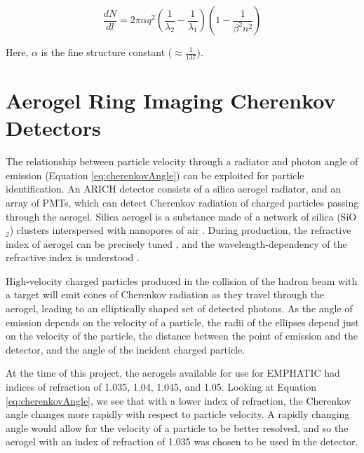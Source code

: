 \begin{equation}
    \label{eq:photonNumber}
    \frac{dN}{dl}  = 2\pi\alpha q^2 \left(\frac{1}{\lambda_2} - \frac{1}{\lambda_1}
    \right)\left(1 - \frac{1}{\beta^2n^2}\right)
\end{equation}

Here, $\alpha$ is the fine structure constant ($\approx \frac{1}{137}$).



\section{Aerogel Ring Imaging Cherenkov Detectors}
\label{sec:ARICH}
The relationship between particle velocity through a radiator and photon angle of emission (Equation \ref{eq:cherenkovAngle}) can be exploited for particle identification.
An \ac{ARICH} detector consists of a silica aerogel radiator, and an array of \ac{PMT}s, which can detect Cherenkov radiation of charged particles passing through the aerogel.
Silica aerogel is a substance made of a network of silica (SiO$_2$) clusters interspersed with nanopores of air \cite{aerogelRefraction}.
During production, the refractive index of aerogel can be precisely tuned \cite{aerogelRefraction}, and the wavelength-dependency of the refractive index is understood \cite{aerogelWavelength}. 



High-velocity charged particles produced in the collision of the hadron beam with a target will emit cones of Cherenkov radiation as they travel through the aerogel, leading to an elliptically shaped set of detected photons.
As the angle of emission depends on the velocity of a particle, the radii of the ellipses depend just on the velocity of the particle, the distance between the point of emission and the detector, and the angle of the incident charged particle.

At the time of this project, the aerogels available for use for EMPHATIC had indices of refraction of 1.035, 1.04, 1.045, and 1.05.
Looking at Equation \ref{eq:cherenkovAngle}, we see that with a lower index of refraction, the Cherenkov angle changes more rapidly with respect to particle velocity. 
A rapidly changing angle would allow for the velocity of a particle to be better resolved, and so the aerogel with an index of refraction of 1.035 was chosen to be used in the detector.

